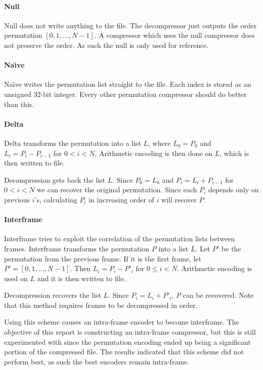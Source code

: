 \documentclass[a4paper]{report}
\begin{document}
\paragraph{Null}
Null does not write anything to the file. The decompressor just outputs the
order permutation $[0,1,\dots,N-1]$. A compressor which uses the null
compressor does not preserve the order. As such the null is only used for
reference.

\paragraph{Na\"{\i}ve}
Na\"{\i}ve writes the permutation list straight to the file. Each index is
stored as an unsigned $32$-bit integer. Every other permutation compressor
should do better than this.

\paragraph{Delta}
Delta transforms the permutation into a list $L$, where $L_0 = P_0$ and $L_i =
P_i - P_{i-1}$ for $0 < i < N$. Arithmetic encoding is then done on $L$, which
is then written to file.

Decompression gets back the list $L$. Since $P_0 = L_0$ and $P_i = L_i +
P_{i-1}$ for $0 < i < N$ we can recover the original permutation. Since each
$P_i$ depends only on previous $i$'s, calculating $P_i$ in increasing order of
$i$ will recover $P$.

\paragraph{Interframe}
Interframe tries to exploit the correlation of the permutation lists between
frames. Interframe transforms the permutation $P$ into a list $L$. Let $P'$ be
the permutation from the previous frame. If it is the first frame, let $P' =
[0,1,\dots,N-1]$. Then $L_i = P_i - P'_i$ for $0 \le i < N$. Arithmetic
encoding is used on $L$ and it is then written to file.

Decompression recovers the list $L$. Since $P_i = L_i + P'_i$, $P$ can be
recovered. Note that this method requires frames to be decompressed in order.

Using this scheme causes an intra-frame encoder to become interframe. The
objective of this report is constructing an intra-frame compressor, but this
is still experimented with since the permutation encoding ended up being a
significant portion of the compressed file. The results indicated that this
scheme did not perform best, as such the best encoders remain intra-frame.
\end{document}
